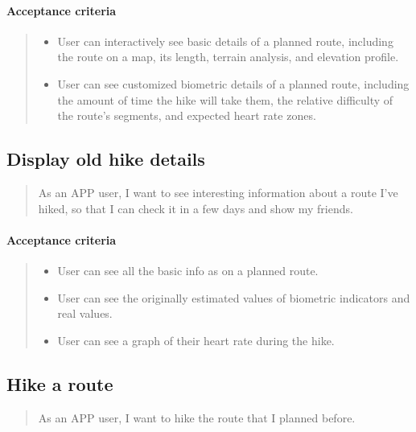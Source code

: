 \paragraph*{Acceptance criteria}
\begin{quote}
\begin{itemize}
    \item User can interactively see basic details of a planned route, including the route on a map, its length, terrain analysis, and elevation profile.
    \item User can see customized biometric details of a planned route, including the amount of time the hike will take them, the relative difficulty of the route's segments, and expected heart rate zones.
\end{itemize}
\end{quote}

\subsection{Display old hike details}\label{US:map-old-details}
\begin{quote}
As an APP user, I want to see interesting information about a route I've hiked, so that I can check it in a few days and show my friends.
\end{quote}

\paragraph*{Acceptance criteria}
\begin{quote}
\begin{itemize}
    \item User can see all the basic info as on a planned route.
    \item User can see the originally estimated values of biometric indicators and real values.
    \item User can see a graph of their heart rate during the hike.
\end{itemize}
\end{quote}

\subsection{Hike a route}\label{US:map-hike}
\begin{quote}
As an APP user, I want to hike the route that I planned before.
\end{quote}

